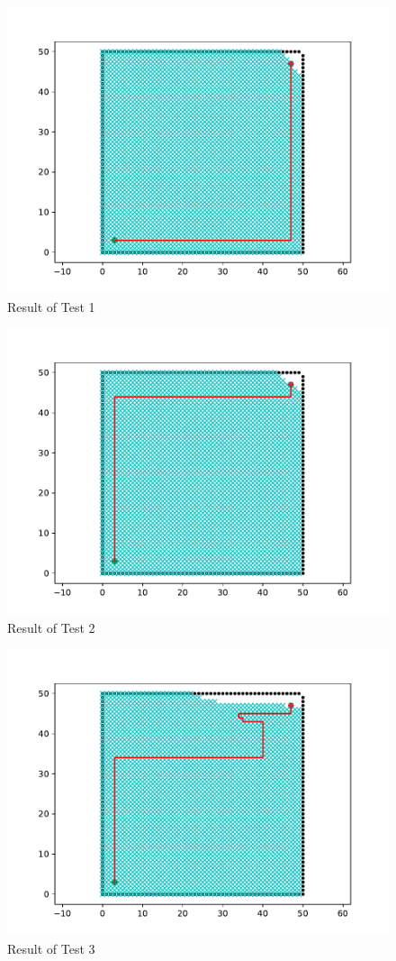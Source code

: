 \begin{figure}
    \centering  
	\includegraphics[width=0.9\linewidth]{0.1.pdf}  
	\caption{Result of Test 1}
    \label{Test 1}
\end{figure}
\begin{figure}
    \centering  
	\includegraphics[width=0.9\linewidth]{1.pdf}  
	\caption{Result of Test 2}
    \label{Test 2}
\end{figure}
\begin{figure}
    \centering  
	\includegraphics[width=0.9\linewidth]{10.pdf}  
	\caption{Result of Test 3}
    \label{Test 3}
\end{figure}
